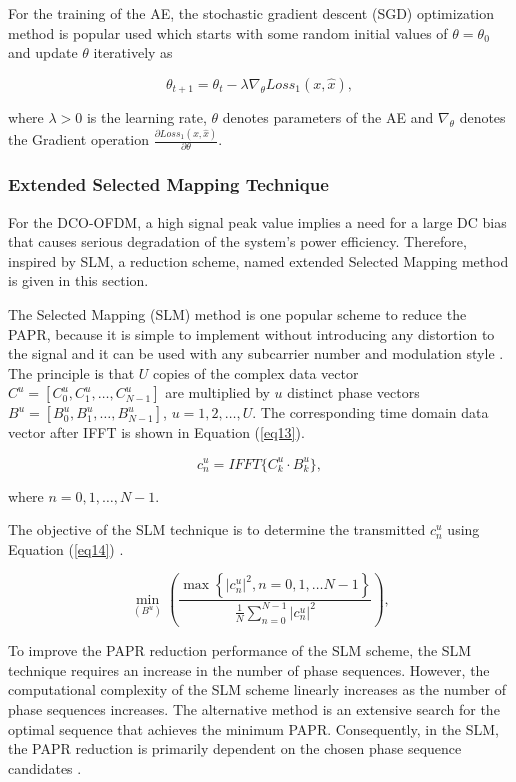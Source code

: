 \documentclass[conference]{IEEEtran}
\begin{document}
For the training of the AE, the stochastic gradient descent (SGD) \cite{b33} optimization method is popular used which starts with some random initial values of $\theta = \theta_0$ and update $\theta$ iteratively as

\begin{equation}
\theta_{t+1} = \theta_t - \lambda \nabla_\theta Loss_1(x, \hat{x}),
\label{eq12}
\end{equation}

where $\lambda > 0$ is the learning rate, $\theta$ denotes parameters of the AE and $\nabla_\theta$ denotes the Gradient operation $\frac{\partial Loss_1(x, \hat{x})}{\partial \theta}$.

\subsubsection{Extended Selected Mapping Technique}
For the DCO-OFDM, a high signal peak value implies a need for a large DC bias that causes serious degradation of the system's power efficiency. Therefore, inspired by SLM, a reduction scheme, named extended Selected Mapping method is given in this section.

The Selected Mapping (SLM) method is one popular scheme to reduce the PAPR, because it is simple to implement without introducing any distortion to the signal and it can be used with any subcarrier number and modulation style \cite{b36}. The principle is that $U$ copies of the complex data vector $C^u = [C^u_0, C^u_1, \dots , C^u_{N-1}]$ are multiplied by $u$ distinct phase vectors $B^u = [B^u_0, B^u_1, \dots , B^u_{N-1}]$, $u = 1, 2, \dots , U$. The corresponding time domain data vector after IFFT is shown in Equation (\ref{eq13}).

\begin{equation}
c_n^u = IFFT\{C_k^u \cdot B_k^u\},
\label{eq13}
\end{equation}

where $n = 0, 1, \dots , N - 1$.

The objective of the SLM technique is to determine the transmitted $c_n^u$ using Equation (\ref{eq14}) \cite{b29}.

\begin{equation}
\min_{(B^u)} \left( \frac{\max \left\{|c_n^u|^2, n = 0, 1, \dots N - 1\right\} }{\frac{1}{N} \sum_{n=0}^{N-1} |c_n^u|^2} \right),
\label{eq14}
\end{equation}

To improve the PAPR reduction performance of the SLM scheme, the SLM technique requires an increase in the number of phase sequences. However, the computational complexity of the SLM scheme linearly increases as the number of phase sequences increases. The alternative method is an extensive search for the optimal sequence that achieves the minimum PAPR. Consequently, in the SLM, the PAPR reduction is primarily dependent on the chosen phase sequence candidates \cite{b37}.
\end{document}
